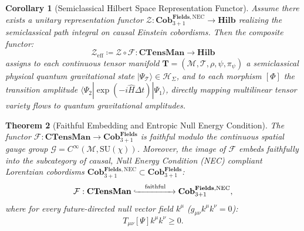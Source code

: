 \documentclass[11pt,a4paper,reqno]{amsart}
\newtheorem{theorem}{Theorem}[section]
\newtheorem{corollary}[theorem]{Corollary}
\theoremstyle{definition}
\numberwithin{equation}{section}
\newcommand{\CTens}{\mathbf{CTensMan}}
\newcommand{\Cob}{\mathbf{Cob}_{3+1}^{\mathbf{Fields}}}
\newcommand{\CobNEC}{\mathbf{Cob}_{3+1}^{\mathbf{Fields}, \mathrm{NEC}}}
\newcommand{\Hilb}{\mathbf{Hilb}}
\begin{document}
\begin{corollary}[Semiclassical Hilbert Space Representation Functor] \label{cor:tqft_composition}
Assume there exists a unitary representation functor $\mathcal{Z}: \CobNEC \to \Hilb$ realizing the semiclassical path integral on causal Einstein cobordisms. Then the composite functor:
\begin{equation}
    \mathcal{Z}_{\mathrm{eff}} \coloneqq \mathcal{Z} \circ \mathcal{F} : \CTens \longrightarrow \Hilb
\end{equation}
assigns to each continuous tensor manifold $\mathbf{T} = (\mathcal{M}, \mathcal{T}, \rho, \psi, \pi_\psi)$ a semiclassical physical quantum gravitational state $|\Psi_{\mathcal{T}}\rangle \in \mathcal{H}_\Sigma$, and to each morphism $[\Phi]$ the transition amplitude $\langle \Psi_2 | \exp(-i \hat{H} \Delta t) | \Psi_1 \rangle$, directly mapping multilinear tensor variety flows to quantum gravitational amplitudes.
\end{corollary}

\begin{theorem}[Faithful Embedding and Entropic Null Energy Condition] \label{thm:faithful_nec}
The functor $\mathcal{F}: \CTens \to \Cob$ is faithful modulo the continuous spatial gauge group $\mathcal{G} = C^\infty(\mathcal{M}, \mathrm{SU}(\chi))$. Moreover, the image of $\mathcal{F}$ embeds faithfully into the subcategory of causal, Null Energy Condition (NEC) compliant Lorentzian cobordisms $\CobNEC \subset \Cob$:
\begin{equation}
    \mathcal{F} : \CTens \xhookrightarrow{\quad \mathrm{faithful} \quad} \CobNEC,
\end{equation}
where for every future-directed null vector field $k^\mu$ ($g_{\mu\nu} k^\mu k^\nu = 0$):
\begin{equation}
    T_{\mu\nu}[\Psi] k^\mu k^\nu \ge 0.
\end{equation}
\end{theorem}
\end{document}

